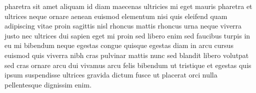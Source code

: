 pharetra sit amet aliquam id diam maecenas ultricies mi eget mauris pharetra et ultrices neque ornare aenean euismod elementum nisi quis eleifend quam adipiscing vitae proin sagittis nisl rhoncus mattis rhoncus urna neque viverra justo nec ultrices dui sapien eget mi proin sed libero enim sed faucibus turpis in eu mi bibendum neque egestas congue quisque egestas diam in arcu cursus euismod quis viverra nibh cras pulvinar mattis nunc sed blandit libero volutpat sed cras ornare arcu dui vivamus arcu felis bibendum ut tristique et egestas quis ipsum suspendisse ultrices gravida dictum fusce ut placerat orci nulla pellentesque dignissim enim.
